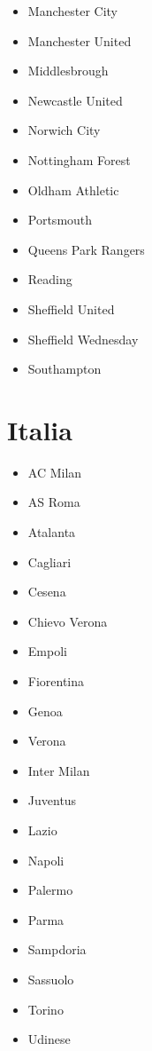 \begin{multicols}{2}
\begin{itemize}
		\item Manchester City

		\item Manchester United

		\item Middlesbrough

		\item Newcastle United

		\item Norwich City

		\item Nottingham Forest

		\item Oldham Athletic

		\item Portsmouth

		\item Queens Park Rangers

		\item Reading

		\item Sheffield United

		\item Sheffield Wednesday

		\item Southampton
		
	\end{itemize}
\end{multicols}


\section{Italia}\label{sec:equipos-ita}
\begin{multicols}{2}
	\begin{itemize}
	    \setlength{\itemsep}{1pt}
	    \setlength{\parskip}{0pt}
	    \setlength{\parsep}{0pt}
		\item AC Milan
		\item AS Roma
		\item Atalanta
		\item Cagliari
		\item Cesena
		\item Chievo Verona
		\item Empoli
		\item Fiorentina
		\item Genoa
		\item Verona
		\item Inter Milan
		\item Juventus
		\item Lazio
		\item Napoli
		\item Palermo
		\item Parma
		\item Sampdoria
		\item Sassuolo
		\item Torino
		\item Udinese
	\end{itemize}
\end{multicols}

